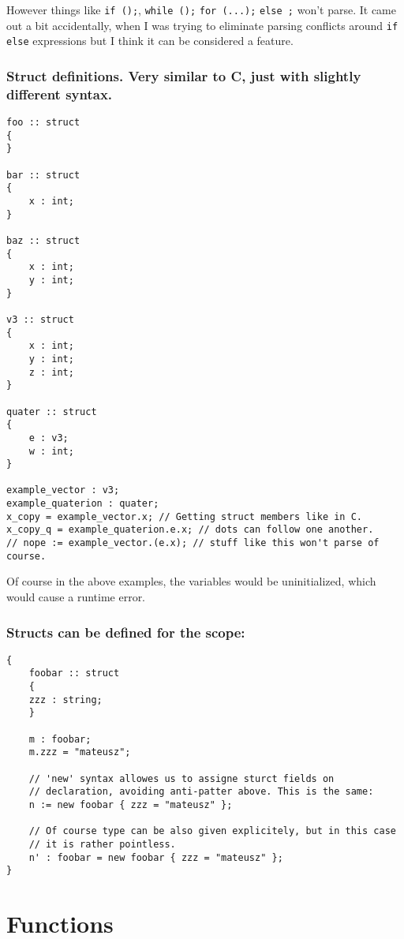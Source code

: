 \documentclass[11pt]{article}
\begin{document}
However things like \texttt{if ();}, \texttt{while ();} \texttt{for (...);}
\texttt{else ;} won't parse. It came out a bit accidentally, when I was
trying to eliminate parsing conflicts around \texttt{if else} expressions but I think
it can be considered a feature.

\subsubsection*{Struct definitions. Very similar to C, just with slightly different syntax.}
\label{sec:org887206d}
\begin{verbatim}
foo :: struct
{
}

bar :: struct
{
    x : int;
}

baz :: struct
{
    x : int;
    y : int;
}

v3 :: struct
{
    x : int;
    y : int;
    z : int;
}

quater :: struct
{
    e : v3;
    w : int;
}

example_vector : v3;
example_quaterion : quater;
x_copy = example_vector.x; // Getting struct members like in C.
x_copy_q = example_quaterion.e.x; // dots can follow one another.
// nope := example_vector.(e.x); // stuff like this won't parse of course.

\end{verbatim}

Of course in the above examples, the variables would be uninitialized, which
would cause a runtime error.

\subsubsection*{Structs can be defined for the scope:}
\label{sec:org0695008}
\begin{verbatim}
{
    foobar :: struct
    {
	zzz : string;
    }

    m : foobar;
    m.zzz = "mateusz";

    // 'new' syntax allowes us to assigne sturct fields on
    // declaration, avoiding anti-patter above. This is the same:
    n := new foobar { zzz = "mateusz" };

    // Of course type can be also given explicitely, but in this case
    // it is rather pointless.
    n' : foobar = new foobar { zzz = "mateusz" };
}
\end{verbatim}

\section*{Functions}
\label{sec:org37ec742}
\end{document}
